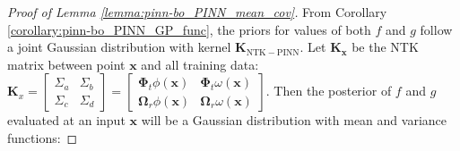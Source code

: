 \begin{proof} [Proof of Lemma \ref{lemma:pinn-bo_PINN_mean_cov}]
From Corollary \ref{corollary:pinn-bo_PINN_GP_func}, the priors for values of both $f$ and $g$ follow a joint Gaussian distribution with kernel $\mathbf{K}_\mathrm{NTK-PINN}$. Let $\mathbf{K_x}$ be the NTK matrix between point $\mathbf{x}$ and all training data: $\mathbf{K}_x = \begin{bmatrix}
        \Sigma_a & \Sigma_b \\
        \Sigma_c & \Sigma_d
    \end{bmatrix} =\begin{bmatrix}
         \boldsymbol{\Phi}_t \phi(\mathbf{x}) & 
         \boldsymbol{\Phi}_t \omega(\mathbf{x}) \\
         \boldsymbol{\Omega}_r\phi(\mathbf{x}) &
          \boldsymbol{\Omega}_r  \omega(\mathbf{x})  \end{bmatrix}$. 
Then the posterior of $f$ and $g$ evaluated at an input $\mathbf{x}$ will be a Gaussian distribution with mean and variance functions:

\end{proof}
